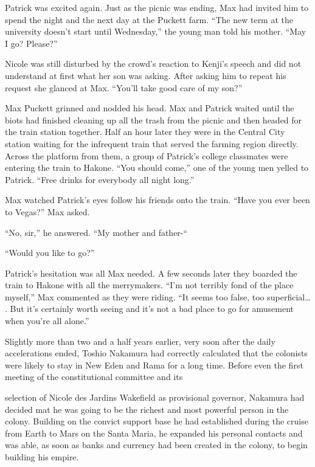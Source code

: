 \documentclass[]{article}
\begin{document}
{Patrick was excited again. Just as the picnic was ending, Max had invited him to spend the night and the next day at the Puckett farm. “The new term at the university doesn’t start until Wednesday,” the young man told his mother. “May I go? Please?”

Nicole was still disturbed by the crowd’s reaction to Kenji’s speech and did not understand at first what her son was asking. After asking him to repeat his request she glanced at Max. “You’ll take good care of my son?”

Max Puckett grinned and nodded his head. Max and Patrick waited until the biots had finished cleaning up all the trash from the picnic and then headed for the train station together. Half an hour later they were in the Central City station waiting for the infrequent train that served the farming region directly. Across the platform from them, a group of Patrick’s college classmates were entering the train to Hakone. “You should come,” one of the young men yelled to Patrick. “Free drinks for everybody all night long.”

Max watched Patrick’s eyes follow his friends onto the train. “Have you ever been to Vegas?” Max asked.

“No, sir,” he answered. “My mother and father-“

“Would you like to go?”

Patrick’s hesitation was all Max needed. A few seconds later they boarded the train to Hakone with all the merrymakers. “I’m not terribly fond of the place myself,” Max commented as they were riding. “It seems too false, too superficial… . But it’s certainly worth seeing and it’s not a bad place to go for amusement when you’re all alone.”

Slightly more than two and a half years earlier, very soon after the daily accelerations ended, Toshio Nakamura had correctly calculated that the colonists were likely to stay in New Eden and Rama for a long time. Before even the first meeting of the constitutional committee and its

selection of Nicole des Jardins Wakefield as provisional governor, Nakamura had decided mat he was going to be the richest and most powerful person in the colony. Building on the convict support base he had established during the cruise from Earth to Mars on the Santa Maria, he expanded his personal contacts and was able, as soon as banks and currency had been created in the colony, to begin building his empire.

}
\end{document}
